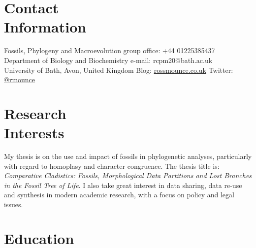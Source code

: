 \documentclass[margin,line]{resume}
\begin{document}
\begin{resume}

    \section{\mysidestyle Contact\\Information}

    Fossils, Phylogeny and Macroevolution group             \hfill office: +44 01225385437          \vspace{0mm}\\\vspace{0mm}%
    Department of Biology and Biochemistry                  \hfill e-mail: rcpm20@bath.ac.uk          \vspace{0mm}\\\vspace{0mm}%
    University of Bath, Avon, United Kingdom                \hfill Blog: \href{http://rossmounce.co.uk/}{rossmounce.co.uk} Twitter: \href{http://twitter.com/rmounce}{@rmounce}     \vspace{0mm}\\\vspace{-4.5mm}%


    \section{\mysidestyle Research\\Interests}

    My thesis is on the use and impact of fossils in phylogenetic analyses, particularly with regard to homoplasy and character congruence. The thesis title is: \textsl{Comparative Cladistics: Fossils, Morphological Data Partitions and Lost Branches in the Fossil Tree of Life}. I also take great interest in data sharing, data re-use and synthesis in modern academic research, with a focus on policy and legal issues. \\

\vspace{-7 mm}


    \section{\mysidestyle Education}


\end{resume}
\end{document}
